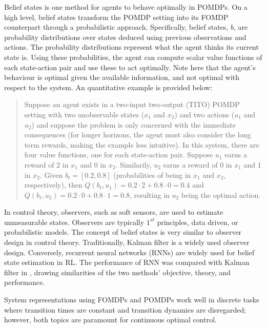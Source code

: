Belief states is one method for agents to behave optimally in POMDPs. On a high level, belief states transform the POMDP setting into its FOMDP counterpart through a probabilistic approach. Specifically, belief states, $b$, are probability distributions over states deduced using previous observations and actions. The probability distributions represent what the agent thinks its current state is. Using these probabilities, the agent can compute scalar value functions of each state-action pair and use these to act optimally.  Note here that the agent's behaviour is optimal given the available information, and not optimal with respect to the system. An quantitative example is provided below:
\begin{quote}
    Suppose an agent exists in a two-input two-output (TITO) POMDP setting with two unobservable states ($x_1$ and $x_2$) and two actions ($u_1$ and $u_2$) and suppose the problem is only concerned with the immediate consequences (for longer horizons, the agent must also consider the long term rewards, making the example less intuitive). In this system, there are four value functions, one for each state-action pair. Suppose $u_1$ earns a reward of 2 in $x_1$ and 0 in $x_2$.  Similarily, $u_2$ earns a reward of 0 in $x_1$ and 1 in $x_2$.  Given $b_t = [0.2, 0.8]$ (probabilities of being in $x_1$ and $x_2$, respectively), then $Q(b_t, u_1) = 0.2 \cdot 2 + 0.8 \cdot 0 = 0.4$ and $Q(b_t, u_2) = 0.2 \cdot 0 + 0.8 \cdot 1 = 0.8$, resulting in $u_2$ being the optimal action.
\end{quote}

In control theory, observers, such as soft sensors, are used to estimate unmeasurable states.  Observers are typically $1^{st}$ principles, data driven, or probabilistic models. The concept of belief states is very similar to observer design in control theory. Traditionally, Kalman filter is a widely used observer design. Conversely, recurrent neural networks (RNNs) are widely used for belief state estimation in RL. The performance of RNN was compared with Kalman filter in \cite{RNNvsKF}, drawing similarities of the two methods' objective, theory, and performance.

System representations using FOMDPs and POMDPs work well in discrete tasks where transition times are constant and transition dynamics are disregarded; however, both topics are paramount for continuous optimal control.  







